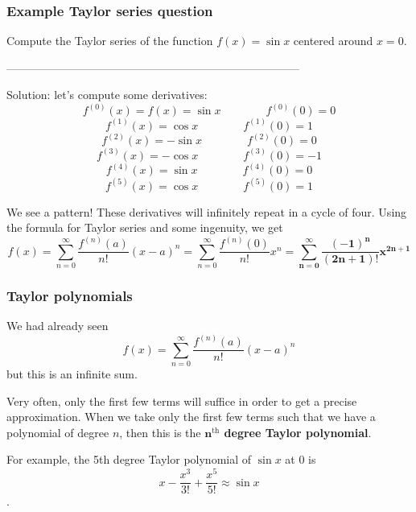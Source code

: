 \begin{frame}
\frametitle{Example Taylor series question}
{\scriptsize
Compute the Taylor series of the function $f(x)=\sin x$ centered around $x=0$.

------------------------------------------------------------------------------

\pause
Solution: let's compute some derivatives:
\[f^{(0)}(x)=f(x)=\sin x\quad\quad\quad\quad f^{(0)}(0)=0\]
\vspace*{-\baselineskip}\pause\[f^{(1)}(x)=\cos x\quad\quad\quad\quad f^{(1)}(0)=1\]
\vspace*{-\baselineskip}\pause\[f^{(2)}(x)=-\sin x\quad\quad\quad\quad f^{(2)}(0)=0\]
\vspace*{-\baselineskip}\pause\[f^{(3)}(x)=-\cos x\quad\quad\quad\quad f^{(3)}(0)=-1\]
\vspace*{-\baselineskip}\pause\[f^{(4)}(x)=\sin x\quad\quad\quad\quad f^{(4)}(0)=0\]
\vspace*{-\baselineskip}\pause\[f^{(5)}(x)=\cos x\quad\quad\quad\quad f^{(5)}(0)=1\]

\pause We see a pattern! These derivatives will infinitely repeat in a cycle of four. Using the formula for Taylor series and some ingenuity, we get
\pause\[f(x)=\sum_{n=0}^\infty \frac{f^{(n)}(a)}{n!}(x-a)^n=\sum_{n=0}^\infty \frac{f^{(n)}(0)}{n!}x^n=\pmb{\sum_{n=0}^\infty \frac{(-1)^{n}}{(2n+1)!}x^{2n+1}}\]
}
\end{frame}

\begin{frame}
\frametitle{Taylor polynomials}

We had already seen \[f(x)=\sum_{n=0}^\infty \frac{f^{(n)}(a)}{n!}(x-a)^n\] but this is an infinite sum.

\pause Very often, only the first few terms will suffice in order to get a precise approximation. When we take only the first few terms such that we have a polynomial of degree $n$, then this is the \textbf{$\pmb{n}^{\text{th}}$ degree Taylor polynomial}.

\pause For example, the 5th degree Taylor polynomial of $\sin x$ at 0 is \[ x-\frac{x^3}{3!}+\frac{x^5}{5!}\approx\sin x\].

\end{frame}